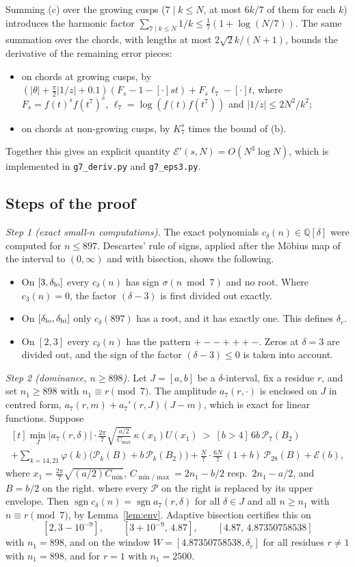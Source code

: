 \documentclass[11pt]{amsart}
\theoremstyle{remark}
\theoremstyle{definition}
\newcommand{\Q}{\mathbb Q}
\newcommand{\cP}{\mathcal P}
\newcommand{\cE}{\mathcal E}
\newcommand{\sgn}{\operatorname{sgn}}
\begin{document}
Summing (c) over the growing cusps ($7\mid k\le N$, at most $6k/7$ of them for each $k$) introduces the harmonic factor $\sum_{7\mid k\le N}1/k\le\frac17(1+\log(N/7))$. The same summation over the chords, with lengths at most $2\sqrt2k/(N+1)$, bounds the derivative of the remaining error pieces:
\begin{itemize}[leftmargin=2em]
\item on chords at growing cusps, by $(|\theta|+\frac\pi2|1/z|+0.1)(F_s-1-[\cdot]st)+F_s\ell_7-[\cdot]t$, where $F_s=f(t)^sf(t^7)^s$, $\ell_7=\log(f(t)f(t^7))$ and $|1/z|\le2N^2/k^2$;
\item on chords at non-growing cusps, by $K_7^s$ times the bound of (b).
\end{itemize}
Together this gives an explicit quantity $\cE'(s,N)=O(N^3\log N)$, which is implemented in \texttt{g7\_deriv.py} and \texttt{g7\_eps3.py}.

\subsection{Steps of the proof}
\emph{Step 1 (exact small-$n$ computations).} The exact polynomials $c_\delta(n)\in\Q[\delta]$ were computed for $n\le897$. Descartes' rule of signs, applied after the M\"obius map of the interval to $(0,\infty)$ and with bisection, shows the following.
\begin{itemize}[leftmargin=2em]
\item On $[3,\delta_{\rm lo}]$ every $c_\delta(n)$ has sign $\sigma(n\bmod7)$ and no root. Where $c_3(n)=0$, the factor $(\delta-3)$ is first divided out exactly.
\item On $[\delta_{\rm lo},\delta_{\rm hi}]$ only $c_\delta(897)$ has a root, and it has exactly one. This defines $\delta_c$.
\item On $[2,3]$ every $c_\delta(n)$ has the pattern $+--+++-$. Zeros at $\delta=3$ are divided out, and the sign of the factor $(\delta-3)\le0$ is taken into account.
\end{itemize}

\emph{Step 2 (dominance, $n\ge898$).} Let $J=[a,b]$ be a $\delta$-interval, fix a residue $r$, and set $n_1\ge898$ with $n_1\equiv r\pmod 7$. The amplitude $a_7(r,\cdot)$ is enclosed on $J$ in centred form, $a_7(r,m)+a_7'(r,J)(J-m)$, which is exact for linear functions. Suppose
\[
\begin{multlined}[t]\min_J|a_7(r,\delta)|\cdot\frac{2\pi}7\sqrt{\frac{a/2}{C_{\max}}}\,\kappa(x_1)U(x_1)\ >\ [b>4]\,6b\,\cP_7(B_2)\\+\sum_{k=14,21}\varphi(k)\big(\cP_k(B)+b\,\cP_k(B_2)\big)+\frac N7\cdot\frac{6N}7\,(1+b)\,\cP_{28}(B)+\cE(b),\end{multlined}
\]
where $x_1=\frac{2\pi}7\sqrt{(a/2)C_{\min}}$, $C_{\min/\max}=2n_1-b/2$ resp.\ $2n_1-a/2$, and $B=b/2$ on the right.
where every $\cP$ on the right is replaced by its upper envelope. Then $\sgn c_\delta(n)=\sgn a_7(r,\delta)$ for all $\delta\in J$ and all $n\ge n_1$ with $n\equiv r\pmod 7$, by Lemma~\ref{lem:env}. Adaptive bisection certifies this on
\[
[2,3-10^{-9}],\qquad [3+10^{-9},\,4.87],\qquad [4.87,\,4.87350758538]
\]
with $n_1=898$, and on the window $W=[4.87350758538,\delta_c]$ for all residues $r\neq1$ with $n_1=898$, and for $r=1$ with $n_1=2500$.
\end{document}
